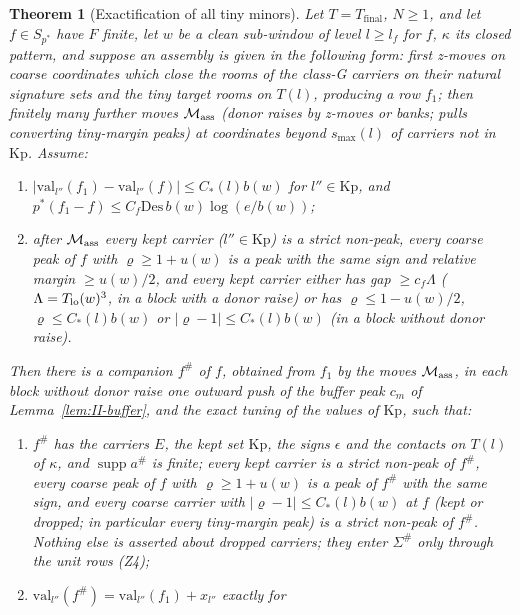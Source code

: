 \documentclass[10pt]{amsart}
\newtheorem{theorem}{Theorem}[section]
\theoremstyle{definition}
\theoremstyle{remark}
\newcommand{\supp}{\operatorname{supp}}
\begin{document}
\begin{theorem}[Exactification of all tiny minors]\label{thm:II-B}
Let $T=T_{\mathrm{final}}$, $N\ge1$, and let $f\in S_{p^*}$ have $F$ finite, let $w$ be a clean sub-window of level
$l\ge l_f$ for $f$, $\kappa$ its closed pattern, and suppose an assembly is
given in the following form: first z-moves on coarse coordinates which close
the rooms of the class-G carriers on their natural signature sets and the
tiny target rooms on $T(l)$, producing a row $f_1$; then finitely many
further moves $\mathcal M_{\rm ass}$ \textup{(}donor raises by z-moves or
banks; pulls converting tiny-margin peaks\textup{)} at coordinates beyond
$s_{\max}(l)$ of carriers not in $\mathrm{Kp}$.  Assume:
\begin{enumerate}
\item[(A1)] $|\mathrm{val}_{l''}(f_1)-\mathrm{val}_{l''}(f)|\le C_*(l)b(w)$ for
$l''\in\mathrm{Kp}$, and $p^*(f_1-f)\le C_f\mathrm{Des}\,b(w)\log(e/b(w))$;
\item[(A2)] after $\mathcal M_{\rm ass}$ every kept carrier
\textup{(}$l''\in\mathrm{Kp}$\textup{)} is a strict non-peak, every coarse
peak of $f$ with $\varrho\ge1+u(w)$ is a peak with the same sign and
relative margin $\ge u(w)/2$, and every kept carrier either has gap $\ge
c_f\Lambda$
\textup{(}$\Lambda=T_{\rm lo}(w)^3$, in a block with a donor raise\textup{)}
or has $\varrho\le1-u(w)/2$, $\varrho\le C_*(l)b(w)$ or $|\varrho-1|\le
C_*(l)b(w)$ \textup{(}in a block without donor raise\textup{)}.
\end{enumerate}
Then there is a companion $f^\#$ of $f$, obtained from $f_1$ by the moves
$\mathcal M_{\rm ass}$, in each block without donor raise one outward push
of the buffer peak $c_m$ of Lemma~\textup{\ref{lem:II-buffer}}, and the
exact tuning of the values of $\mathrm{Kp}$, such that:
\begin{enumerate}
\item[(a)] $f^\#$ has the carriers $E$, the kept set $\mathrm{Kp}$, the signs
$\epsilon$ and the contacts on $T(l)$ of $\kappa$, and $\supp a^\#$ is
finite; every kept carrier is a strict non-peak of $f^\#$, every coarse peak
of $f$ with $\varrho\ge1+u(w)$ is a peak of $f^\#$ with the same sign, and
every coarse carrier with $|\varrho-1|\le C_*(l)b(w)$ at $f$ \textup{(}kept
or dropped; in particular every tiny-margin peak\textup{)} is a strict
non-peak of $f^\#$.  Nothing else is asserted about dropped carriers; they
enter $\Sigma^\#$ only through the unit rows \textup{(Z4)};
\item[(b)] $\mathrm{val}_{l''}(f^\#)=\mathrm{val}_{l''}(f_1)+x_{l''}$ exactly for

\end{enumerate}
\end{theorem}
\end{document}

